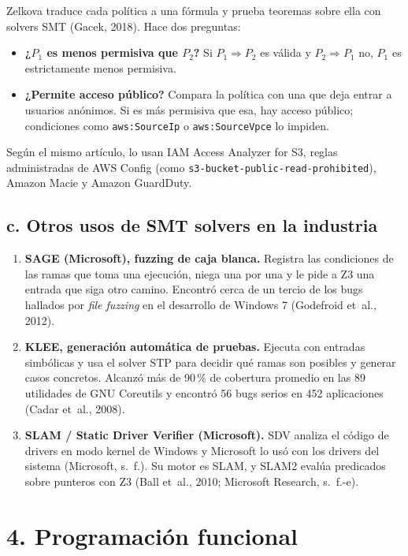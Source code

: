 \documentclass[11pt,letterpaper]{article}
\begin{document}
Zelkova traduce cada política a una fórmula y prueba teoremas sobre ella con solvers SMT (Gacek, 2018). Hace dos preguntas:
\begin{itemize}[nosep]
  \item \textbf{¿$P_1$ es menos permisiva que $P_2$?} Si $P_1 \Rightarrow P_2$ es válida y $P_2 \Rightarrow P_1$ no, $P_1$ es estrictamente menos permisiva.
  \item \textbf{¿Permite acceso público?} Compara la política con una que deja entrar a usuarios anónimos. Si es más permisiva que esa, hay acceso público; condiciones como \texttt{aws:SourceIp} o \texttt{aws:SourceVpce} lo impiden.
\end{itemize}
Según el mismo artículo, lo usan IAM Access Analyzer for S3, reglas administradas de AWS Config (como \texttt{s3-bucket-public-read-prohibited}), Amazon Macie y Amazon GuardDuty.

\subsection*{c. Otros usos de SMT solvers en la industria}

\begin{enumerate}[nosep]
  \item \textbf{SAGE (Microsoft), fuzzing de caja blanca.} Registra las condiciones de las ramas que toma una ejecución, niega una por una y le pide a Z3 una entrada que siga otro camino. Encontró cerca de un tercio de los bugs hallados por \emph{file fuzzing} en el desarrollo de Windows 7 (Godefroid et~al., 2012).
  \item \textbf{KLEE, generación automática de pruebas.} Ejecuta con entradas simbólicas y usa el solver STP para decidir qué ramas son posibles y generar casos concretos. Alcanzó más de 90\,\% de cobertura promedio en las 89 utilidades de GNU Coreutils y encontró 56 bugs serios en 452 aplicaciones (Cadar et~al., 2008).
  \item \textbf{SLAM / Static Driver Verifier (Microsoft).} SDV analiza el código de drivers en modo kernel de Windows y Microsoft lo usó con los drivers del sistema (Microsoft, s.~f.). Su motor es SLAM, y SLAM2 evalúa predicados sobre punteros con Z3 (Ball et~al., 2010; Microsoft Research, s.~f.-e).
\end{enumerate}

\section*{4. Programación funcional}
\end{document}
